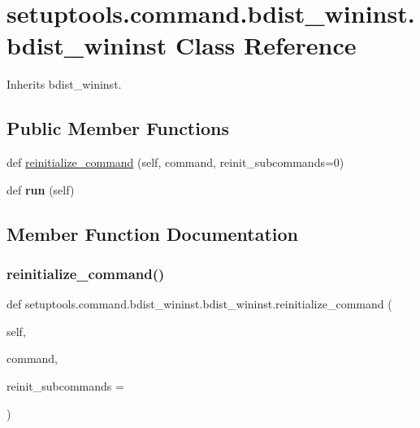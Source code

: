 \hypertarget{classsetuptools_1_1command_1_1bdist__wininst_1_1bdist__wininst}{}\section{setuptools.\+command.\+bdist\+\_\+wininst.\+bdist\+\_\+wininst Class Reference}
\label{classsetuptools_1_1command_1_1bdist__wininst_1_1bdist__wininst}


Inherits bdist\+\_\+wininst.

\subsection*{Public Member Functions}
\begin{DoxyCompactItemize}
\item 
def \hyperlink{classsetuptools_1_1command_1_1bdist__wininst_1_1bdist__wininst_a63c240a9644a63161e7f8580ea471b08}{reinitialize\+\_\+command} (self, command, reinit\+\_\+subcommands=0)
\item 
\mbox{\label{classsetuptools_1_1command_1_1bdist__wininst_1_1bdist__wininst_ab4b5ee0f854cce20fb06f2282b0b5b20}} 
def {\bfseries run} (self)
\end{DoxyCompactItemize}


\subsection{Member Function Documentation}
\mbox{\label{classsetuptools_1_1command_1_1bdist__wininst_1_1bdist__wininst_a63c240a9644a63161e7f8580ea471b08}} 
\subsubsection{\texorpdfstring{reinitialize\+\_\+command()}{reinitialize\_command()}}
{\footnotesize\ttfamily def setuptools.\+command.\+bdist\+\_\+wininst.\+bdist\+\_\+wininst.\+reinitialize\+\_\+command (\begin{DoxyParamCaption}\item[{}]{self,  }\item[{}]{command,  }\item[{}]{reinit\+\_\+subcommands = {} }\end{DoxyParamCaption})}

